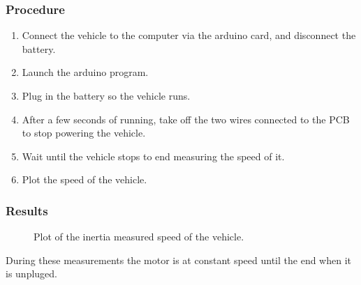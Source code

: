 \subsubsection{Procedure}

\begin{enumerate}
  \item Connect the vehicle to the computer via the arduino card, and disconnect the battery.
  \item Launch the arduino program.
  \item Plug in the battery so the vehicle runs.
  \item After a few seconds of running, take off the two wires connected to the PCB to stop powering the vehicle.
  \item Wait until the vehicle stops to end measuring the speed of it.
  \item Plot the speed of the vehicle.
\end{enumerate}

\subsubsection{Results}

\begin{figure}[H]
  \centering
  \caption{Plot of the inertia measured speed of the vehicle.}
  \label{intertiaTestPlot}
\end{figure}

During these measurements the motor is at constant speed until the end when it is unpluged.